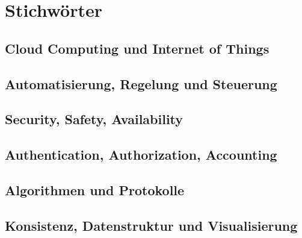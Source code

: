 \section{Stichwörter}

\subsection{Cloud Computing und Internet of Things}

\subsection{Automatisierung, Regelung und Steuerung}

\subsection{Security, Safety, Availability}

\subsection{Authentication, Authorization, Accounting}

\subsection{Algorithmen und Protokolle}

\subsection{Konsistenz, Datenstruktur und Visualisierung}